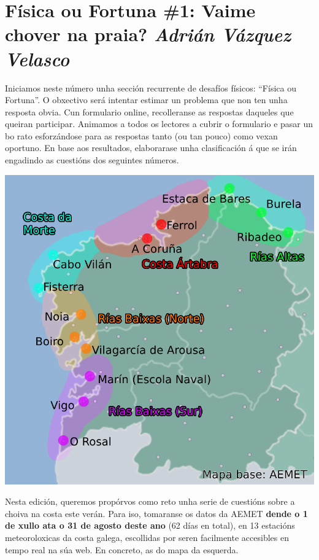 \section*{\textcolor{Resalte}{Física ou Fortuna \#1: Vaime chover na praia?} {\normalfont \itshape Adrián Vázquez Velasco}}%

\begin{multicols}{2}

Iniciamos neste número unha sección recurrente de desafíos físicos: ``Física ou Fortuna''. O obxectivo será intentar estimar un problema que non ten unha resposta obvia. Cun formulario online, recolleranse as respostas daqueles que queiran participar. Animamos a todos os lectores a cubrir o formulario e pasar un bo rato esforzándose para as respostas tanto (ou tan pouco) como vexan oportuno. En base aos resultados, elaborarase unha clasificación á que se irán engadindo as cuestións dos seguintes números.

\begin{center}
    \includegraphics[width=0.8\linewidth]{revistas/002/imaxes/mapa.png}
\end{center}

Nesta edición, queremos propórvos como reto unha serie de cuestións sobre a choiva na costa este verán. Para iso, tomaranse os datos da AEMET \textbf{dende o 1 de xullo ata o 31 de agosto deste ano} (62 días en total), en 13 estacións meteoroloxicas da costa galega, escollidas por seren facilmente accesibles en tempo real na súa web. En concreto, as do mapa da esquerda.


\end{multicols}
